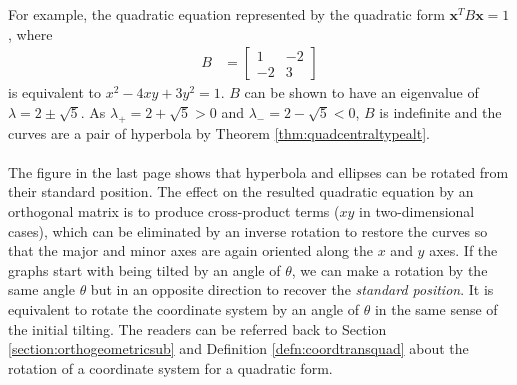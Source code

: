 For example, the quadratic equation represented by the quadratic form $\textbf{x}^TB\textbf{x} = 1$, where
\begin{align*}
B &=
\begin{bmatrix}
1 & -2 \\
-2 & 3
\end{bmatrix}
\end{align*}
is equivalent to $x^2 - 4xy + 3y^2 = 1$. $B$ can be shown to have an eigenvalue of $\lambda = 2 \pm \sqrt{5}$. As $\lambda_+ = 2 + \sqrt{5} > 0$ and $\lambda_- = 2 - \sqrt{5} < 0$, $B$ is indefinite and the curves are a pair of hyperbola by Theorem \ref{thm:quadcentraltypealt}.\\
\\
The figure in the last page shows that hyperbola and ellipses can be rotated from their standard position. The effect on the resulted quadratic equation by an orthogonal matrix is to produce cross-product terms ($xy$ in two-dimensional cases), which can be eliminated by an inverse rotation to restore the curves so that the major and minor axes are again oriented along the $x$ and $y$ axes. If the graphs start with being tilted by an angle of $\theta$, we can make a rotation by the same angle $\theta$ but in an opposite direction to recover the \textit{standard position}. It is equivalent to rotate the coordinate system by an angle of $\theta$ in the same sense of the initial tilting. The readers can be referred back to Section \ref{section:orthogeometricsub} and Definition \ref{defn:coordtransquad} about the rotation of a coordinate system for a quadratic form.

